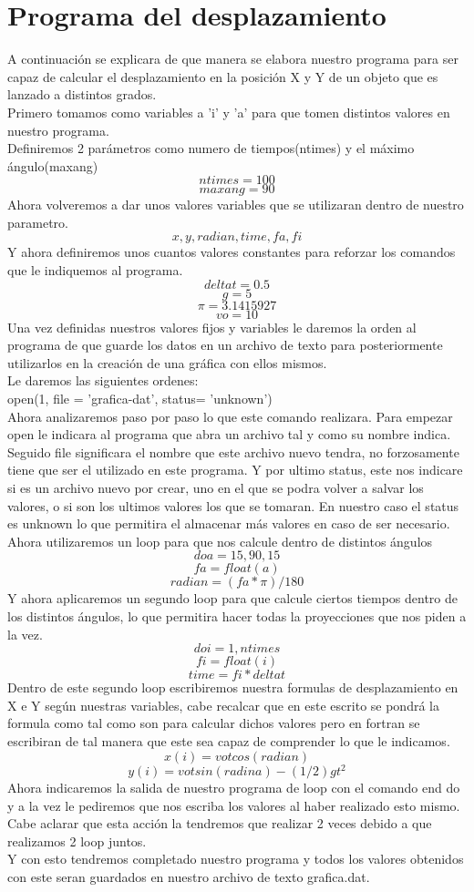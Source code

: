 \documentclass{article}
\begin{document}
\section{Programa del desplazamiento}
A continuación se explicara de que manera se elabora nuestro programa para ser capaz de calcular el desplazamiento en la posición X y Y de un objeto que es lanzado a distintos grados. \\
Primero tomamos como variables a 'i' y 'a' para que tomen distintos valores en nuestro programa.\\
Definiremos 2 parámetros como numero de tiempos(ntimes) y el máximo ángulo(maxang)
\[ntimes=100\]
\[maxang=90\]
Ahora volveremos a dar unos valores variables que se utilizaran dentro de nuestro parametro.
\[x,y,radian,time,fa,fi\]
Y ahora definiremos unos cuantos valores constantes para reforzar los comandos que le indiquemos al programa.
\[deltat=0.5\]
\[g=5\]
\[\pi=3.1415927\]
\[vo=10\]
Una vez definidas nuestros valores fijos y variables le daremos la orden al programa de que guarde los datos en un archivo de texto para posteriormente utilizarlos en la creación de una gráfica con ellos mismos.\\
Le daremos las siguientes ordenes:\\
open(1, file = 'grafica-dat', status= 'unknown')\\
Ahora analizaremos paso por paso lo que este comando realizara. Para empezar open le indicara al programa que abra un archivo tal y como su nombre indica. Seguido file significara el nombre que este archivo nuevo tendra, no forzosamente tiene que ser el utilizado en este programa. Y por ultimo status, este nos indicare si es un archivo nuevo por crear, uno en el que se podra volver a salvar los valores, o si son los ultimos valores los que se tomaran. En nuestro caso el status es unknown  lo que permitira el almacenar más valores en caso de ser necesario.\\
Ahora utilizaremos un loop para que nos calcule dentro de distintos ángulos
 \[do  a=15, 90, 15\]
\[fa=float(a)\]
\[radian=(fa*\pi)/180\]
Y ahora aplicaremos un segundo loop para que calcule ciertos tiempos dentro de los distintos ángulos, lo que permitira hacer todas la proyecciones que nos piden a la vez.
\[do i=1, ntimes\]
\[fi=float(i)\]
\[time=fi*deltat\]
Dentro de este segundo loop escribiremos nuestra formulas de desplazamiento en X e Y según nuestras variables, cabe recalcar que en este escrito se pondrá la formula como tal como son para calcular dichos valores pero en fortran se escribiran de tal manera que este sea capaz de comprender lo que le indicamos.
\[x(i)=votcos(radian)\]
\[y(i)=votsin(radina)-(1/2)gt^2\]
Ahora indicaremos la salida de nuestro programa de loop con el comando end do y a la vez le pediremos que nos escriba los valores al haber realizado esto mismo. Cabe aclarar que esta acción la tendremos que realizar 2 veces debido a que realizamos 2 loop juntos.\\
Y con esto tendremos completado nuestro programa y todos los valores obtenidos con este seran guardados en nuestro archivo de texto grafica.dat.
\end{document}
